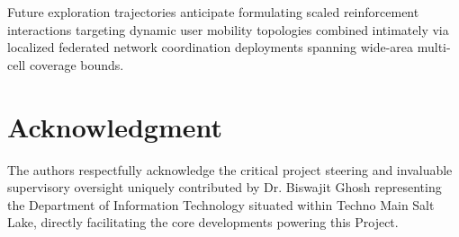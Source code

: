 \documentclass[conference]{IEEEtran}
\begin{document}
Future exploration trajectories anticipate formulating scaled reinforcement interactions targeting dynamic user mobility topologies combined intimately via localized federated network coordination deployments spanning wide-area multi-cell coverage bounds.


\section*{Acknowledgment}
The authors respectfully acknowledge the critical project steering and invaluable supervisory oversight uniquely contributed by Dr. Biswajit Ghosh representing the Department of Information Technology situated within Techno Main Salt Lake, directly facilitating the core developments powering this Project.



%
\end{document}
